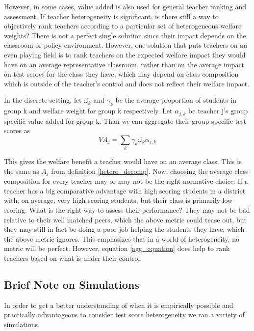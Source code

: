 \documentclass[12pt]{article}
\theoremstyle{definition}
\theoremstyle{definition}
\theoremstyle{definition}
\theoremstyle{definition}
\begin{document}
        However, in some cases,  value added is also used for general teacher ranking and assessment. If teacher heterogeneity is significant, is there still a way to objectively rank teachers according to a particular set of heterogeneous welfare weights? There is not a perfect single solution since their impact depends on the classroom or policy environment. However, one solution that puts teachers on an even playing field is to rank teachers on the expected welfare impact they would have on an average representative classroom, rather than on the average impact on test scores for the class they have, which may depend on class composition which is outside of the teacher's control and does not reflect their welfare impact.
        
        
        In the discrete setting, let $\bar{\omega_k}$ and $\gamma_k$ be the average proportion of students in group k and welfare weight for group k respectively. Let $\alpha_{j,k}$ be teacher j's group specific value added for group k. Than we can aggregate their group specific test scores as 
        \begin{equation}
        \label{agg_equation}
            VA_j = \sum_k \gamma_k \bar{\omega_k} \alpha_{j,k}
        \end{equation}
        
        This gives the welfare benefit a teacher would have on an average class. This is the same as $A_j$ from definition \ref{hetero_decomp}. Now, choosing the average class composition for every teacher may or may not be the right normative choice. If a teacher has a big comparative advantage with high scoring students in a district with, on average, very high scoring students, but their class is primarily low scoring. What is the right way to assess their performance? They may not be bad relative to their well matched peers, which the above metric could tease out, but they may still in fact be doing a poor job helping the students they have, which the above metric ignores. This emphasizes that in a world of heterogeneity, no metric will be perfect. However, equation \ref{agg_equation} does help to rank teachers based on what is under their control. 
        

    \subsection{Brief Note on Simulations }
        In order to get a better understanding of when it is empirically possible and practically advantageous to consider test score heterogeneity we ran a variety of simulations. 
\end{document}
